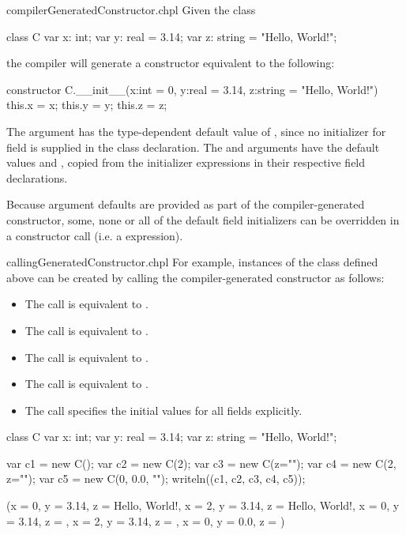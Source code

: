 \begin{chapelexample}{compilerGeneratedConstructor.chpl}
Given the class
\begin{chapel}
class C {
  var x: int;
  var y: real = 3.14;
  var z: string = "Hello, World!";
}
\end{chapel}
the compiler will generate a constructor equivalent to the following:
\begin{chapel}
constructor C.__init__(x:int = 0, y:real = 3.14, z:string = "Hello, World!")
{ this.x = x; this.y = y; this.z = z; }
{}
\end{chapel}
The  argument has the type-dependent default value of , since no initializer for
field  is supplied in the class declaration. The  and 
arguments have the default values  and ,
copied from the initializer expressions in their respective field declarations.
\end{chapelexample}

Because argument defaults are provided as part of the compiler-generated
constructor, some, none or all of the default field initializers can be
overridden in a constructor call (i.e. a  expression).

\begin{chapelexample}{callingGeneratedConstructor.chpl}
For example, instances of the class  defined above can be created by calling the compiler-generated constructor as follows:
\begin{itemize}
\item The call  is equivalent to .
\item The call  is equivalent to .
\item The call  is equivalent to .
\item The call  is equivalent to .
\item The call  specifies the initial values for all fields explicitly.
\end{itemize}
\begin{chapelpre}
class C {
  var x: int;
  var y: real = 3.14;
  var z: string = "Hello, World!";
}
\end{chapelpre}
\begin{chapelpost}
var c1 = new C();
var c2 = new C(2);
var c3 = new C(z="");
var c4 = new C(2, z="");
var c5 = new C(0, 0.0, "");
writeln((c1, c2, c3, c4, c5));
\end{chapelpost}
\begin{chapeloutput}
({x = 0, y = 3.14, z = Hello, World!}, {x = 2, y = 3.14, z = Hello, World!}, {x = 0, y = 3.14, z = }, {x = 2, y = 3.14, z = }, {x = 0, y = 0.0, z = })
\end{chapeloutput}
\end{chapelexample}

